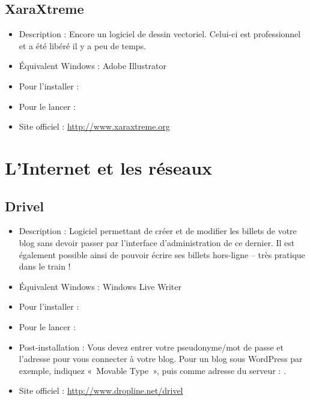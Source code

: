 \subsection{XaraXtreme}
\label{RefXaraXtreme}
\begin{itemize}
\begingroup
{}
\item Description : Encore un logiciel de dessin vectoriel. Celui-ci est professionnel et a été libéré il y a peu de temps.{\par}
\item Équivalent Windows : Adobe Illustrator{\par}
\item Pour l'installer : 
\item Pour le lancer : 
\item Site officiel : \url{http://www.xaraxtreme.org}{\par}
\endgroup
\end{itemize}

\section{L'Internet et les réseaux}
\subsection{Drivel}
\begin{itemize}
\begingroup
{}
\item Description : Logiciel permettant de créer et de modifier les billets de votre blog sans devoir passer par l'interface d'administration de ce dernier. Il est également possible ainsi de pouvoir écrire ses billets hors-ligne -- très pratique dans le train !{\par}
\endgroup
\item Équivalent Windows : Windows Live Writer{\par}
\item Pour l'installer : 
\item Pour le lancer : 
\item Post-installation : Vous devez entrer votre pseudonyme/mot de passe et l'adresse pour vous connecter à votre blog. Pour un blog sous WordPress par exemple, indiquez «~Movable Type~», puis comme adresse du serveur : .{\par}
\item Site officiel : \url{http://www.dropline.net/drivel}{\par}
\end{itemize}
\newpage
